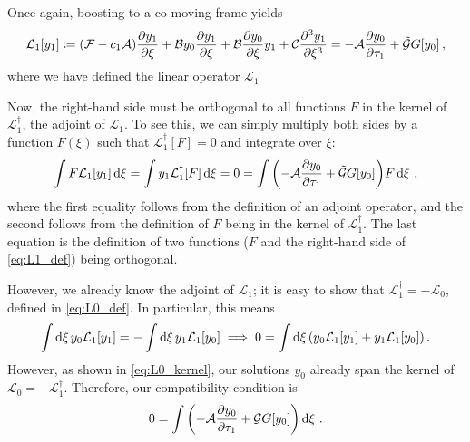 \documentclass{jfm}
\begin{document}
Once again, boosting to a co-moving frame yields
\begin{equation}
  \mathcal{L}_{1} [y_1] \coloneqq
    \pqty{\mathcal{F} -c_1 \mathcal{A}} \pdv{y_1}{\xi}
    + \mathcal{B} y_0 \pdv{y_1}{\xi}
    + \mathcal{B} \pdv{y_0}{\xi} y_1
    + \mathcal{C} \pdv[3]{y_1}{\xi}
  = - \mathcal{A} \pdv{y_0}{\tau_1}
    + \mathcal{\tilde{G}} G[y_0] \,,
  \label{eq:L1_def}
\end{equation}
where we have defined the linear operator $\mathcal{L}_{1}$

Now, the right-hand side must be orthogonal to all functions $F$ in the
kernel of $\mathcal{L}_1^{\dagger}$, \ie the adjoint of
$\mathcal{L}_1$.
To see this, we can simply multiply both sides by a function $F(\xi)$
such that $\mathcal{L}_1^{\dagger}[F] = 0$ and integrate over $\xi$:
\begin{equation}
  \int F \mathcal{L}_1 [y_1] \dd{\xi}
  = \int y_1 \mathcal{L}_1^{\dagger} [F] \dd{\xi}
  = 0
  =
  \int \pqty{- \mathcal{A} \pdv{y_0}{\tau_1} + \mathcal{\tilde{G}}
    G[y_0] } F \dd{\xi} \,,
\end{equation}
where the first equality follows from the definition of an adjoint
operator, and the second follows from the definition of $F$ being in the
kernel of $\mathcal{L}_1^{\dagger}$.
The last equation is the definition of two functions ($F$ and the
right-hand side of \cref{eq:L1_def}) being orthogonal.

However, we already know the adjoint of $\mathcal{L}_1$; it is easy
to show that $\mathcal{L}_1^{\dagger} = -\mathcal{L}_0$, defined in
\cref{eq:L0_def}.
In particular, this means
\begin{equation}
  \int \dd{\xi} y_0 \mathcal{L}_1 [y_1]
  = -\int \dd{\xi} y_1 \mathcal{L}_1 [y_0]
  \implies
  0 = \int \dd{\xi} \pqty{y_0 \mathcal{L}_1 [y_1] + y_1
    \mathcal{L}_1 [y_0] } \,.
\end{equation}
However, as shown in \cref{eq:L0_kernel}, our solutions $y_0$
already span the kernel of $\mathcal{L}_0 = -\mathcal{L}_1^{\dagger}$.
Therefore, our compatibility condition is
\begin{equation}
  0 = \int \pqty{- \mathcal{A} \pdv{y_0}{\tau_1} + \mathcal{G} G[y_0]}
  \dd{\xi} \,.
  \label{eq:compat_int}
\end{equation}
\end{document}
